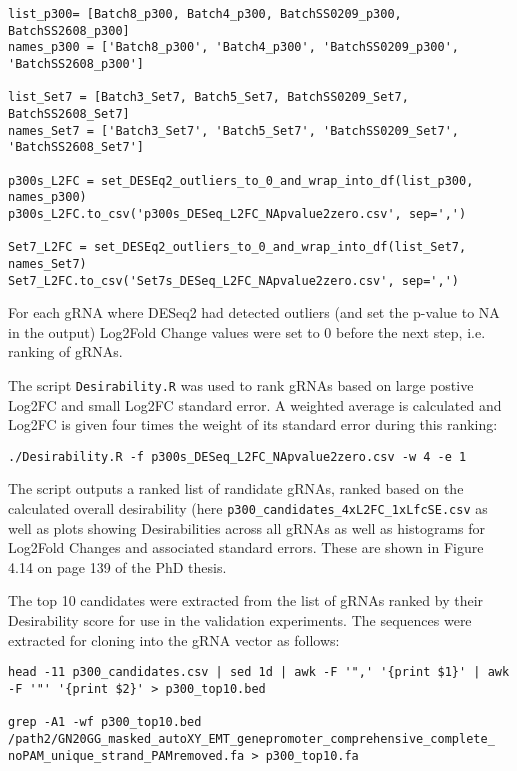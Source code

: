 \begin{small}
\begin{lstlisting}
list_p300= [Batch8_p300, Batch4_p300, BatchSS0209_p300, BatchSS2608_p300]
names_p300 = ['Batch8_p300', 'Batch4_p300', 'BatchSS0209_p300', 'BatchSS2608_p300']

list_Set7 = [Batch3_Set7, Batch5_Set7, BatchSS0209_Set7, BatchSS2608_Set7]
names_Set7 = ['Batch3_Set7', 'Batch5_Set7', 'BatchSS0209_Set7', 'BatchSS2608_Set7']

p300s_L2FC = set_DESEq2_outliers_to_0_and_wrap_into_df(list_p300, names_p300)
p300s_L2FC.to_csv('p300s_DESeq_L2FC_NApvalue2zero.csv', sep=',')

Set7_L2FC = set_DESEq2_outliers_to_0_and_wrap_into_df(list_Set7, names_Set7)
Set7_L2FC.to_csv('Set7s_DESeq_L2FC_NApvalue2zero.csv', sep=',')
\end{lstlisting}\end{small}

For each gRNA where DESeq2 had detected outliers (and set the p-value to NA in the output) Log2Fold Change values were set to 0 before the next step, i.e. ranking of gRNAs.

The script \verb|Desirability.R| was used to rank gRNAs based on large postive Log2FC and small Log2FC standard error. A weighted average is calculated and Log2FC is given four times the weight of its standard error during this ranking:

\begin{small}\begin{lstlisting}
./Desirability.R -f p300s_DESeq_L2FC_NApvalue2zero.csv -w 4 -e 1
\end{lstlisting}\end{small}

The script outputs a ranked list of randidate gRNAs, ranked based on the calculated overall desirability  (here \verb|p300_candidates_4xL2FC_1xLfcSE.csv| as well as plots showing Desirabilities across all gRNAs as well as histograms for Log2Fold Changes and associated standard errors. These are shown in Figure 4.14 on page 139 of the PhD thesis.

The top 10 candidates were extracted from the list of gRNAs ranked by their Desirability score for use in the validation experiments. The sequences were extracted for cloning into the gRNA vector as follows:

\begin{small}\begin{lstlisting}
head -11 p300_candidates.csv | sed 1d | awk -F '",' '{print $1}' | awk -F '"' '{print $2}' > p300_top10.bed

grep -A1 -wf p300_top10.bed /path2/GN20GG_masked_autoXY_EMT_genepromoter_comprehensive_complete_
noPAM_unique_strand_PAMremoved.fa > p300_top10.fa
\end{lstlisting}\end{small}


